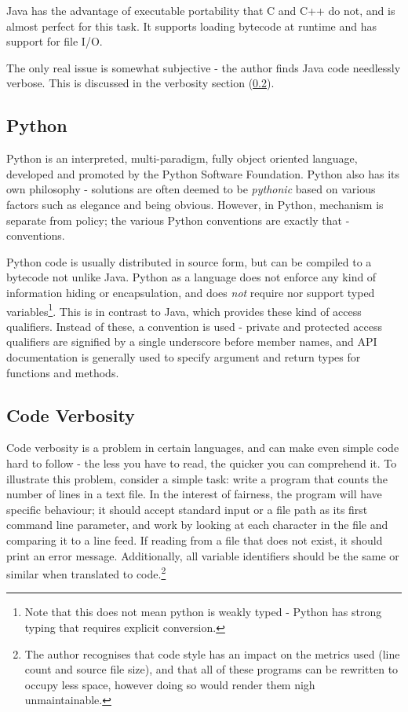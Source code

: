 \documentclass[10pt,a4paper,notitlepage]{report}
\begin{document}
Java has the advantage of executable portability that C and C++ do not, and is almost perfect for this task. It supports loading bytecode at runtime and has support for file I/O.

The only real issue is somewhat subjective - the author finds Java code needlessly verbose. This is discussed in the verbosity section (\ref{sec:verbosity}).

\subsection{Python}
Python is an interpreted, multi-paradigm, fully object oriented language, developed and promoted by the Python Software Foundation\cite{python}. Python also has its own philosophy - solutions are often deemed to be \emph{pythonic} based on various factors such as elegance and being obvious. However, in Python, mechanism is separate from policy; the various Python conventions are exactly that - conventions.

Python code is usually distributed in source form, but can be compiled to a bytecode not unlike Java. Python as a language does not enforce any kind of information hiding or encapsulation, and does \emph{not} require nor support typed variables\footnote{Note that this does not mean python is weakly typed -  Python has strong typing that requires explicit conversion.}. This is in contrast to Java, which provides these kind of access qualifiers. Instead of these, a convention is used - private and protected access qualifiers are signified by a single underscore before member names, and API documentation is generally used to specify argument and return types for functions and methods.

\subsection{Code Verbosity}
\label{sec:verbosity}
Code verbosity is a problem in certain languages, and can make even simple code hard to follow - the less you have to read, the quicker you can comprehend it.
\pagebreak
To illustrate this problem, consider a simple task: write a program that counts the number of lines in a text file.
In the interest of fairness, the program will have specific behaviour; it should accept standard input or a file path as its first command line parameter, and work by looking at each character in the file and comparing it to a line feed. If reading from a file that does not exist, it should print an error message. Additionally, all variable identifiers should be the same or similar when translated to code.\footnote{The author recognises that code style has an impact on the metrics used (line count and source file size), and that all of these programs can be rewritten to occupy less space, however doing so would render them nigh unmaintainable.}
\end{document}
